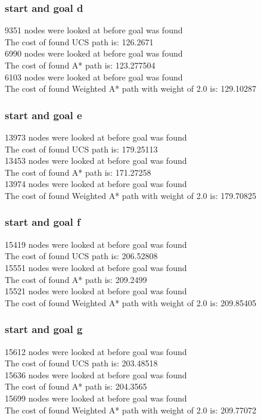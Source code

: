 \documentclass[11pt]{article} %
\begin{document}
\subsubsection{start and goal d}
9351 nodes were looked at before goal was found\\
The cost of found UCS path is: 126.2671\\
6990 nodes were looked at before goal was found\\
The cost of found A* path is: 123.277504\\
6103 nodes were looked at before goal was found\\
The cost of found Weighted A* path with weight of 2.0 is: 129.10287\\
\subsubsection{start and goal e}
13973 nodes were looked at before goal was found\\
The cost of found UCS path is: 179.25113\\
13453 nodes were looked at before goal was found\\
The cost of found A* path is: 171.27258\\
13974 nodes were looked at before goal was found\\
The cost of found Weighted A* path with weight of 2.0 is: 179.70825\\
\subsubsection{start and goal f}
15419 nodes were looked at before goal was found\\
The cost of found UCS path is: 206.52808\\
15551 nodes were looked at before goal was found\\
The cost of found A* path is: 209.2499\\
15521 nodes were looked at before goal was found\\
The cost of found Weighted A* path with weight of 2.0 is: 209.85405\\
\subsubsection{start and goal g}
15612 nodes were looked at before goal was found\\
The cost of found UCS path is: 203.48518\\
15636 nodes were looked at before goal was found\\
The cost of found A* path is: 204.3565\\
15699 nodes were looked at before goal was found\\
The cost of found Weighted A* path with weight of 2.0 is: 209.77072\\
\end{document}
